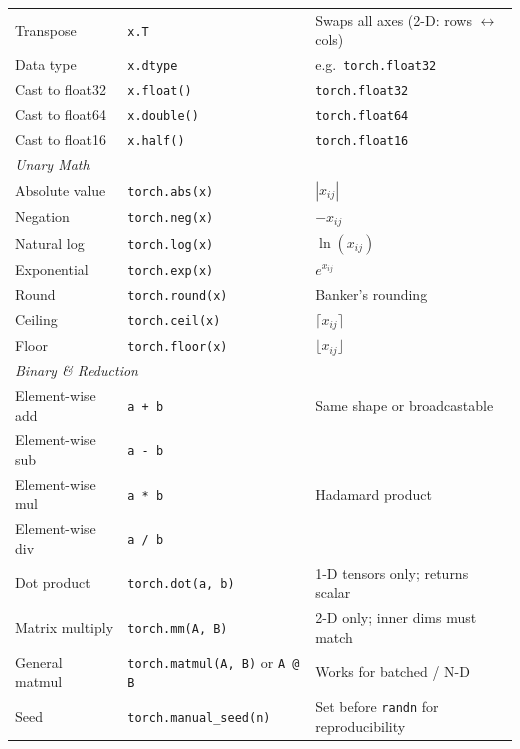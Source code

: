 \documentclass[12pt,a4paper]{article}
\newcommand{\ttt}[1]{\texttt{#1}}
\begin{document}
\begin{table}[ht]
\begin{tabularx}{\linewidth}{l l X}
    Transpose        & \ttt{x.T}                       & Swaps all axes (2-D: rows $\leftrightarrow$ cols) \\
    Data type        & \ttt{x.dtype}                   & e.g.\ \ttt{torch.float32} \\
    Cast to float32  & \ttt{x.float()}                 & \ttt{torch.float32} \\
    Cast to float64  & \ttt{x.double()}                & \ttt{torch.float64} \\
    Cast to float16  & \ttt{x.half()}                  & \ttt{torch.float16} \\
    \midrule
    \multicolumn{3}{l}{\itshape Unary Math} \\
    \midrule
    Absolute value   & \ttt{torch.abs(x)}              & $|x_{ij}|$ \\
    Negation         & \ttt{torch.neg(x)}              & $-x_{ij}$ \\
    Natural log      & \ttt{torch.log(x)}              & $\ln(x_{ij})$ \\
    Exponential      & \ttt{torch.exp(x)}              & $e^{x_{ij}}$ \\
    Round            & \ttt{torch.round(x)}            & Banker's rounding \\
    Ceiling          & \ttt{torch.ceil(x)}             & $\lceil x_{ij} \rceil$ \\
    Floor            & \ttt{torch.floor(x)}            & $\lfloor x_{ij} \rfloor$ \\
    \midrule
    \multicolumn{3}{l}{\itshape Binary \& Reduction} \\
    \midrule
    Element-wise add & \ttt{a + b}                     & Same shape or broadcastable \\
    Element-wise sub & \ttt{a - b}                     & \\
    Element-wise mul & \ttt{a * b}                     & Hadamard product \\
    Element-wise div & \ttt{a / b}                     & \\
    Dot product      & \ttt{torch.dot(a, b)}           & 1-D tensors only; returns scalar \\
    Matrix multiply  & \ttt{torch.mm(A, B)}            & 2-D only; inner dims must match \\
    General matmul   & \ttt{torch.matmul(A, B)} or \ttt{A @ B} & Works for batched / N-D \\
    Seed             & \ttt{torch.manual\_seed(n)}     & Set before \ttt{randn} for reproducibility \\
    \bottomrule
  \end{tabularx}
\end{table}
\end{document}
